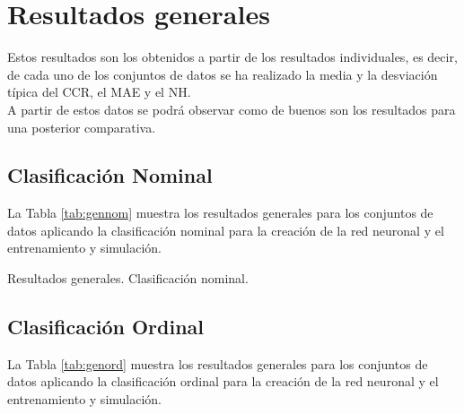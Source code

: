 	\section{Resultados generales}
		
		Estos resultados son los obtenidos a partir de los resultados individuales, es decir, de cada uno de los conjuntos de datos se ha realizado la media y la desviación típica del CCR, el MAE y el NH.\\
		
		A partir de estos datos se podrá observar como de buenos son los resultados para una posterior comparativa.
		
		\subsection{Clasificación Nominal}
		
			La Tabla \ref{tab:gennom} muestra los resultados generales para los conjuntos de datos aplicando la clasificación nominal para la creación de la red neuronal y el entrenamiento y simulación.\\
		
			\begin{table}[!htbp]
				\centering
				\caption{Resultados generales. Clasificación nominal.}
				\label{tab:gennom}
			\end{table}
		
		\subsection{Clasificación Ordinal}
		
			La Tabla \ref{tab:genord} muestra los resultados generales para los conjuntos de datos aplicando la clasificación ordinal para la creación de la red neuronal y el entrenamiento y simulación.
	
